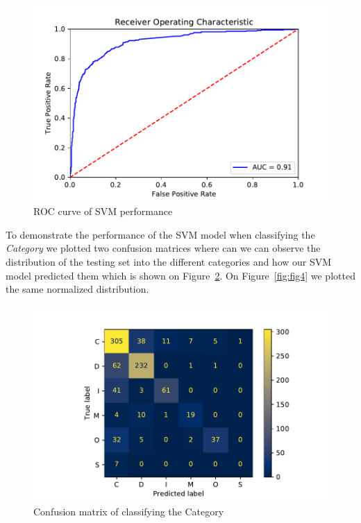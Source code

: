 \documentclass[11pt,a4paper]{article}
\begin{document}
\begin{figure}[h]
    \centering
    \includegraphics[width=1.0\columnwidth]{Figures/rocsvm.pdf}
    \caption{ROC curve of SVM performance}
    \label{fig:fig2}
\end{figure}

To demonstrate the performance of the SVM model when classifying the \textit{Category} we plotted two confusion matrices where can we can observe the distribution of the testing set into the different categories and how our SVM model predicted them which is shown on Figure~\ref{fig:fig3}.
On Figure~\ref{fig:fig4} we plotted the same normalized distribution.

\begin{figure}[h]
    \centering
    \includegraphics[width=1.0\columnwidth]{Figures/confusionMatrixCategory.pdf}
    \caption{Confusion matrix of classifying the Category }
    \label{fig:fig3}
\end{figure}
\end{document}
